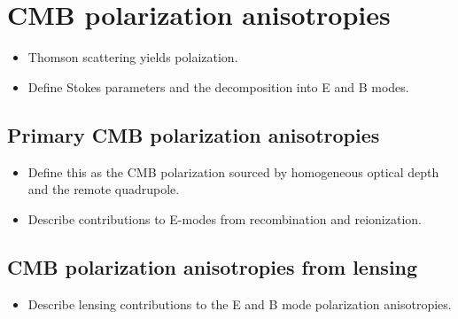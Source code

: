 \documentclass[aps,nofootinbib,groupedaddress]{revtex4}
\begin{document}


\section{CMB polarization anisotropies}

\begin{itemize}
\item Thomson scattering yields polaization.
\item Define Stokes parameters and the decomposition into E and B modes.
\end{itemize}

\subsection{Primary CMB polarization anisotropies}

\begin{itemize}
\item Define this as the CMB polarization sourced by homogeneous optical depth and the remote quadrupole. 
\item Describe contributions to E-modes from recombination and reionization.
\end{itemize}

\subsection{CMB polarization anisotropies from lensing}

\begin{itemize}
\item Describe lensing contributions to the E and B mode polarization anisotropies.
\end{itemize}
\end{document}
